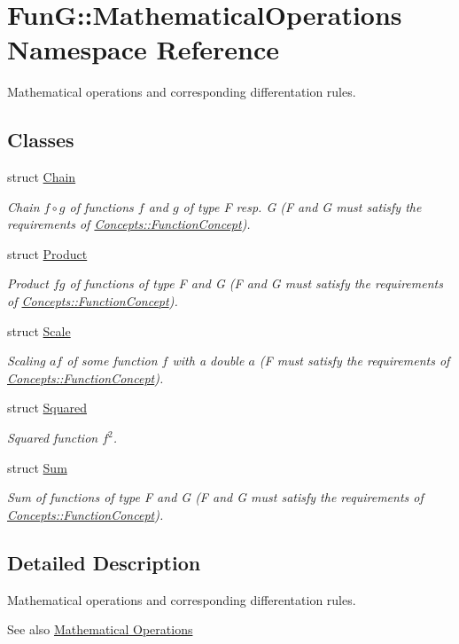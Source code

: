 \hypertarget{namespaceFunG_1_1MathematicalOperations}{}\section{FunG\+:\+:Mathematical\+Operations Namespace Reference}
\label{namespaceFunG_1_1MathematicalOperations}


Mathematical operations and corresponding differentation rules.  


\subsection*{Classes}
\begin{DoxyCompactItemize}
\item 
struct \hyperlink{structFunG_1_1MathematicalOperations_1_1Chain}{Chain}
\begin{DoxyCompactList}\small\item\em Chain $ f\circ g $ of functions $f$ and $g$ of type F resp. G (F and G must satisfy the requirements of \hyperlink{structFunG_1_1Concepts_1_1FunctionConcept}{Concepts\+::\+Function\+Concept}). \end{DoxyCompactList}\item 
struct \hyperlink{structFunG_1_1MathematicalOperations_1_1Product}{Product}
\begin{DoxyCompactList}\small\item\em Product $fg$ of functions of type F and G (F and G must satisfy the requirements of \hyperlink{structFunG_1_1Concepts_1_1FunctionConcept}{Concepts\+::\+Function\+Concept}). \end{DoxyCompactList}\item 
struct \hyperlink{structFunG_1_1MathematicalOperations_1_1Scale}{Scale}
\begin{DoxyCompactList}\small\item\em Scaling $ af $ of some function $ f $ with a double $ a $ (F must satisfy the requirements of \hyperlink{structFunG_1_1Concepts_1_1FunctionConcept}{Concepts\+::\+Function\+Concept}). \end{DoxyCompactList}\item 
struct \hyperlink{structFunG_1_1MathematicalOperations_1_1Squared}{Squared}
\begin{DoxyCompactList}\small\item\em Squared function $f^2$. \end{DoxyCompactList}\item 
struct \hyperlink{structFunG_1_1MathematicalOperations_1_1Sum}{Sum}
\begin{DoxyCompactList}\small\item\em Sum of functions of type F and G (F and G must satisfy the requirements of \hyperlink{structFunG_1_1Concepts_1_1FunctionConcept}{Concepts\+::\+Function\+Concept}). \end{DoxyCompactList}\end{DoxyCompactItemize}


\subsection{Detailed Description}
Mathematical operations and corresponding differentation rules. 

\begin{DoxySeeAlso}{See also}
\hyperlink{group__MathematicalOperationsGroup}{Mathematical Operations} 
\end{DoxySeeAlso}
